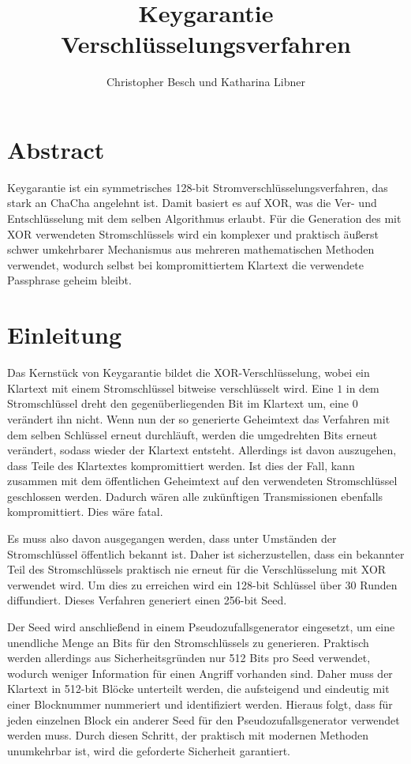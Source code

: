\documentclass[10pt,a4paper]{article}
\author{Christopher Besch und Katharina Libner}
\title{Keygarantie Verschlüsselungsverfahren}
\begin{document}
\maketitle
\tableofcontents
\newpage

\section{Abstract}

Keygarantie ist ein symmetrisches 128-bit Stromverschlüsselungsverfahren, das stark an ChaCha angelehnt ist\cite{Bernstein2008}.
Damit basiert es auf XOR, was die Ver- und Entschlüsselung mit dem selben Algorithmus erlaubt.
Für die Generation des mit XOR verwendeten Stromschlüssels wird ein komplexer und praktisch äußerst schwer umkehrbarer Mechanismus aus mehreren mathematischen Methoden verwendet, wodurch selbst bei kompromittiertem Klartext die verwendete Passphrase geheim bleibt.

\section{Einleitung}

Das Kernstück von Keygarantie bildet die XOR-Verschlüsselung, wobei ein Klartext mit einem Stromschlüssel bitweise verschlüsselt wird.
Eine $1$ in dem Stromschlüssel dreht den gegenüberliegenden Bit im Klartext um, eine $0$ verändert ihn nicht.
Wenn nun der so generierte Geheimtext das Verfahren mit dem selben Schlüssel erneut durchläuft, werden die umgedrehten Bits erneut verändert, sodass wieder der Klartext entsteht.
Allerdings ist davon auszugehen, dass Teile des Klartextes kompromittiert werden.
Ist dies der Fall, kann zusammen mit dem öffentlichen Geheimtext auf den verwendeten Stromschlüssel geschlossen werden.
Dadurch wären alle zukünftigen Transmissionen ebenfalls kompromittiert.
Dies wäre fatal.

\medskip
Es muss also davon ausgegangen werden, dass unter Umständen der Stromschlüssel öffentlich bekannt ist.
Daher ist sicherzustellen, dass ein bekannter Teil des Stromschlüssels praktisch nie erneut für die Verschlüsselung mit XOR verwendet wird.
Um dies zu erreichen wird ein 128-bit Schlüssel über 30 Runden diffundiert.
Dieses Verfahren generiert einen 256-bit Seed.

\medskip
Der Seed wird anschließend in einem Pseudozufallsgenerator eingesetzt, um eine unendliche Menge an Bits für den Stromschlüssels zu generieren.
Praktisch werden allerdings aus Sicherheitsgründen nur 512 Bits pro Seed verwendet, wodurch weniger Information für einen Angriff vorhanden sind.
Daher muss der Klartext in 512-bit Blöcke unterteilt werden, die aufsteigend und eindeutig mit einer Blocknummer nummeriert und identifiziert werden.
Hieraus folgt, dass für jeden einzelnen Block ein anderer Seed für den Pseudozufallsgenerator verwendet werden muss.
Durch diesen Schritt, der praktisch mit modernen Methoden unumkehrbar ist, wird die geforderte Sicherheit garantiert.
\end{document}
